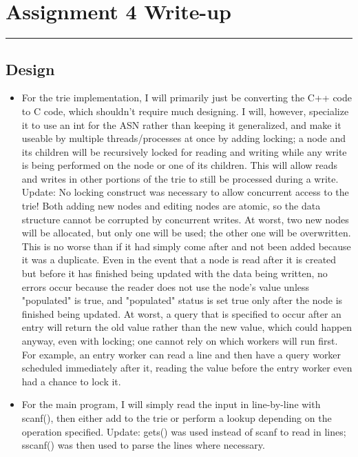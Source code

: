 \documentclass[letterpaper,10pt,fleqn]{article}
\numberwithin{equation}{section}
\begin{document}

\section*{Assignment 4 Write-up}
\hrule

\subsection*{Design}
\begin{itemize}
    \item For the trie implementation, I will primarily just be converting the C++ code to C code, which shouldn't require much designing.  I will, however, specialize it to use an int for the ASN rather than keeping it generalized, and make it useable by multiple threads/processes at once by adding locking; a node and its children will be recursively locked for reading and writing while any write is being performed on the node or one of its children.  This will allow reads and writes in other portions of the trie to still be processed during a write.  Update: No locking construct was necessary to allow concurrent access to the trie!  Both adding new nodes and editing nodes are atomic, so the data structure cannot be corrupted by concurrent writes.  At worst, two new nodes will be allocated, but only one will be used; the other one will be overwritten.  This is no worse than if it had simply come after and not been added because it was a duplicate.  Even in the event that a node is read after it is created but before it has finished being updated with the data being written, no errors occur because the reader does not use the node's value unless "populated" is true, and "populated" status is set true only after the node is finished being updated.  At worst, a query that is specified to occur after an entry will return the old value rather than the new value, which could happen anyway, even with locking; one cannot rely on which workers will run first.  For example, an entry worker can read a line and then have a query worker scheduled immediately after it, reading the value before the entry worker even had a chance to lock it.
    \item For the main program, I will simply read the input in line-by-line with scanf(), then either add to the trie or perform a lookup depending on the operation specified.  Update: gets() was used instead of scanf to read in lines; sscanf() was then used to parse the lines where necessary.

\end{itemize}
\end{document}
